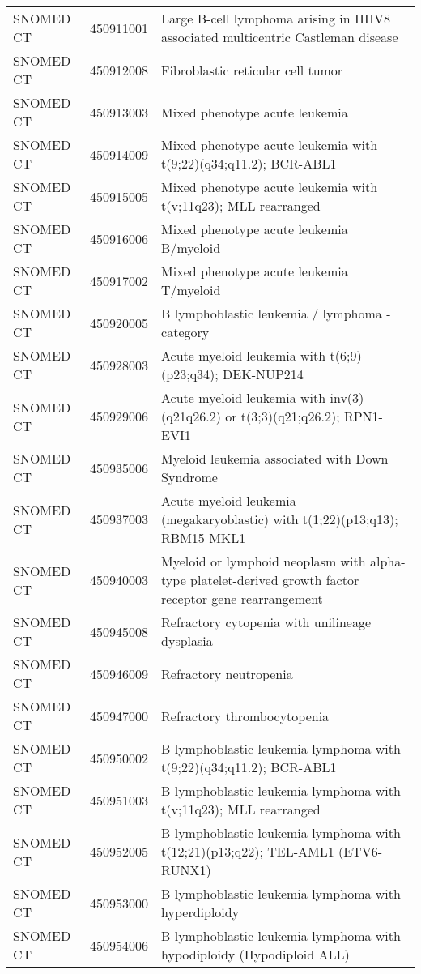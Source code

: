 \begin{table}[ht]
\begin{tabular}{lll}
  SNOMED CT & 450911001 & Large B-cell lymphoma arising in HHV8 associated multicentric Castleman disease \\ 
  SNOMED CT & 450912008 & Fibroblastic reticular cell tumor \\ 
  SNOMED CT & 450913003 & Mixed phenotype acute leukemia \\ 
  SNOMED CT & 450914009 & Mixed phenotype acute leukemia with t(9;22)(q34;q11.2); BCR-ABL1 \\ 
  SNOMED CT & 450915005 & Mixed phenotype acute leukemia with t(v;11q23); MLL rearranged \\ 
  SNOMED CT & 450916006 & Mixed phenotype acute leukemia B/myeloid \\ 
  SNOMED CT & 450917002 & Mixed phenotype acute leukemia T/myeloid \\ 
  SNOMED CT & 450920005 & B lymphoblastic leukemia / lymphoma - category \\ 
  SNOMED CT & 450928003 & Acute myeloid leukemia with t(6;9)(p23;q34); DEK-NUP214 \\ 
  SNOMED CT & 450929006 & Acute myeloid leukemia with inv(3)(q21q26.2) or t(3;3)(q21;q26.2); RPN1-EVI1 \\ 
  SNOMED CT & 450935006 & Myeloid leukemia associated with Down Syndrome \\ 
  SNOMED CT & 450937003 & Acute myeloid leukemia (megakaryoblastic) with t(1;22)(p13;q13); RBM15-MKL1 \\ 
  SNOMED CT & 450940003 & Myeloid or lymphoid neoplasm with alpha-type platelet-derived growth factor receptor gene rearrangement \\ 
  SNOMED CT & 450945008 & Refractory cytopenia with unilineage dysplasia \\ 
  SNOMED CT & 450946009 & Refractory neutropenia \\ 
  SNOMED CT & 450947000 & Refractory thrombocytopenia \\ 
  SNOMED CT & 450950002 & B lymphoblastic leukemia lymphoma with t(9;22)(q34;q11.2); BCR-ABL1 \\ 
  SNOMED CT & 450951003 & B lymphoblastic leukemia lymphoma with t(v;11q23); MLL rearranged \\ 
  SNOMED CT & 450952005 & B lymphoblastic leukemia lymphoma with t(12;21)(p13;q22); TEL-AML1 (ETV6-RUNX1) \\ 
  SNOMED CT & 450953000 & B lymphoblastic leukemia lymphoma with hyperdiploidy \\ 
  SNOMED CT & 450954006 & B lymphoblastic leukemia lymphoma with hypodiploidy (Hypodiploid ALL) \\ 

\end{tabular}
\end{table}
